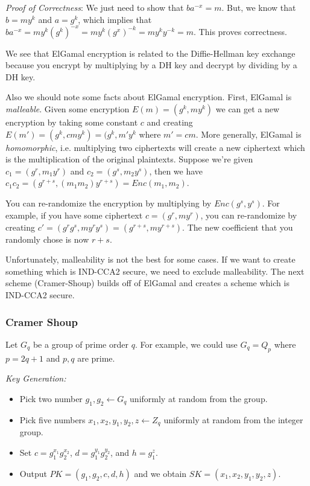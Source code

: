 \documentclass[psamsfonts]{amsart}
\begin{document}
\emph{Proof of Correctness}: We just need to show that $b a^{-x} = m$. But, we know that $b = m y^k$ and $a = g^k$, which implies that $b a^{-x} = m y^k (g^k)^{-x} = m y^k (g^x)^{-k} = m y^k y^{-k} = m$. This proves correctness.

We see that ElGamal encryption is related to the Diffie-Hellman key exchange because you encrypt by multiplying by a DH key and decrypt by dividing by a DH key.

Also we should note some facts about ElGamal encryption. First, ElGamal is \emph{malleable}. Given some encryption $E(m) = (g^k, m y^k)$ we can get a new encryption by taking some constant $c$ and creating $E(m') = (g^k, c m y^k) = (g^k, m' y^k$ where $m' = c m$. More generally, ElGamal is \emph{homomorphic}, i.e. multiplying two ciphertexts will create a new ciphertext which is the multiplication of the original plaintexts. Suppose we're given $c_1 = (g^r, m_1 y^r)$ and $c_2 = (g^s, m_2 y^s)$, then we have $c_1 c_2 = (g^{r+s}, (m_1 m_2) y^{r+s}) = Enc(m_1, m_2)$.

You can re-randomize the encryption by multiplying by $Enc(g^s, y^s)$. For example, if you have some ciphertext $c = (g^r, m y^r)$, you can re-randomize by creating $c' = (g^r g^s, m y^r y^s) = (g^{r+s}, m y^{r+s})$. The new coefficient that you randomly chose is now $r+s$.

Unfortunately, malleability is not the best for some cases. If we want to create something which is IND-CCA2 secure, we need to exclude malleability. The next scheme (Cramer-Shoup) builds off of ElGamal and creates a scheme which is IND-CCA2 secure.

\subsubsection{Cramer Shoup}

Let $G_q$ be a group of prime order $q$. For example, we could use $G_q = Q_p$ where $p = 2q+1$ and $p,q$ are prime.

\emph{Key Generation:}
\begin{itemize}
  \item Pick two number $g_1, g_2 \leftarrow G_q$ uniformly at random from the group.
  \item Pick five numbers $x_1, x_2, y_1, y_2, z \leftarrow Z_q$ uniformly at random from the integer group.
  \item Set $c = g_1^{x_1} g_2^{x_2}$, $d = g_1^{y_1} g_2^{y_2}$, and $h = g_1^z$.
  \item Output $PK = (g_1, g_2, c, d, h)$ and we obtain $SK = (x_1, x_2, y_1, y_2, z)$.
\end{itemize}
\end{document}
